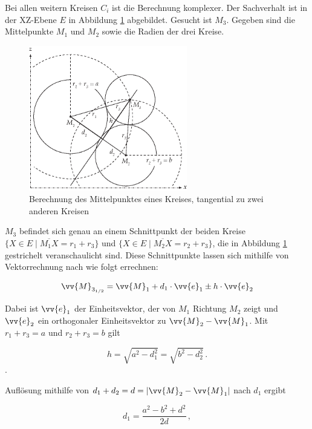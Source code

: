Bei allen weitern Kreisen $C_i$ ist die Berechnung komplexer. Der Sachverhalt ist in der XZ-Ebene $E$ in Abbildung \ref{fig:tangent-circle} abgebildet. Gesucht ist $M_3$. Gegeben sind die Mittelpunkte $M_1$ und $M_2$ sowie die Radien der drei Kreise.

\begin{figure}[htb]
  \includegraphics[width=261.593px]{figures/tangent-circle}
  \caption{Berechnung des Mittelpunktes eines Kreises, tangential zu zwei anderen Kreisen}
  \label{fig:tangent-circle}
\end{figure}

$M_3$ befindet sich genau an einem Schnittpunkt der beiden Kreise $\lbrace X \in E \mid \overline{M_1 X} = r_1 + r_3 \rbrace$ und $\lbrace X \in E \mid \overline{M_2 X} = r_2 + r_3 \rbrace$, die in Abbildung \ref{fig:tangent-circle} gestrichelt veranschaulicht sind. Diese Schnittpunkte lassen sich mithilfe von Vektorrechnung nach \cite{bourke2017intersection, wolfram2017circle} wie folgt errechnen:

\begin{equation}
  \vv{M}_{3_{1/2}} = \vv{M}_1 + d_1 \cdot \vv{e}_1 \pm h \cdot \vv{e}_2
\end{equation}

Dabei ist $\vv{e}_1$ der Einheitsvektor, der von $M_1$ Richtung $M_2$ zeigt und $\vv{e}_2$ ein orthogonaler Einheitsvektor zu $\vv{M}_{2} - \vv{M}_1$. Mit $r_1 + r_3 = a$ und $r_2 + r_3 = b$ gilt

\begin{equation}
\label{equ:h}
  h = \sqrt{a^2 - d_1^2} = \sqrt{b^2 - d_2^2} \,.
\end{equation}.

Auflösung mithilfe von $d_1 + d_2 = d = \vert \vv{M}_2 - \vv{M}_1 \vert$ nach $d_1$ ergibt

\begin{equation}
\label{equ:d1}
  d_1 = \frac{a^2 - b^2 + d^2}{2d} \,,
\end{equation}


